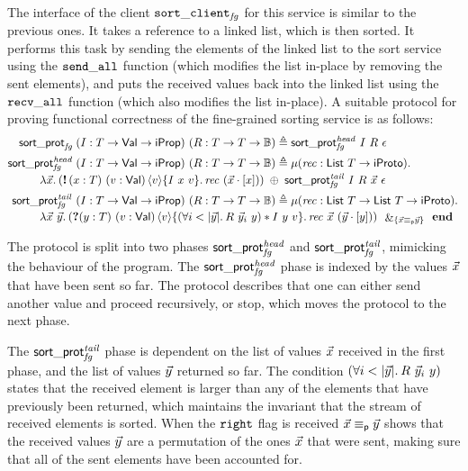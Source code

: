 The interface of the client $\mathtt{sort\_client}_{\mathit{fg}}$ for this service is similar
to the previous ones.
It takes a reference to a linked list, which is then sorted.
It performs this task by sending the elements of the linked list to the sort
service using the $\mathtt{send\_all}$ function (which modifies the list in-place
by removing the sent elements), and puts the received values
back into the linked list using the $\mathtt{recv\_all}$ function (which also modifies
the list in-place).
A suitable protocol for proving functional correctness of the fine-grained
sorting service is as follows:
%
\begin{align*}
\listsortelemprotname\; (\interpvar : \tvar \to \Val \to \Prop)
  \ (\relvar : \tvar \to \tvar \to \bool) \eqdef{}&
  \listsortelemprotheadname\ \interpvar\ \relvar\ \nil \\[0.1em]
\listsortelemprotheadname\; (\interpvar : \tvar \to \Val \to \Prop)
  \ (\relvar : \tvar \to \tvar \to \bool) \eqdef{}&
  \MU (\recvar : \List\ \tvar \to \iProto).\\[-0.2em]
  &\hspace{-22em}
  \Lam \vec\var. \selectprot
    {(\sendprot {(\var : \tvar)\ (\val : \Val)} \val
       {\interpvar\ \var\ \val}
       {\recvar\ (\snoc{\var}{\vec\var})}) \ }
    {\ \listsortelemprottailname\ \interpvar\ \relvar\ \vec{\var}\ \nil} \\[0.1em]
\listsortelemprottailname\ (\interpvar : \tvar \to \Val \to \Prop)
  \ (\relvar : \tvar \to \tvar \to \bool) \eqdef{}&
  \MU (\recvar : \List\ \tvar \to \List\ \tvar \to \iProto). \\[-0.2em]
  &\hspace{-22em}
  \Lam \vec\var\ \vec\varB. \branchprotpropr
  {(\recvprot{(\varB : \tvar)\ (\val : \Val)} \val
     {(\All i < \listlength {\vec\varB}. \relvar\ \vec\varB_i\ \varB) * \interpvar\ \varB\ \val}
     {\recvar\ \vec\var\ (\snoc{\varB}{\vec\varB})}) \ }
  {\vec\var \perm \vec\varB}
  {\ \protend}
\end{align*}
%

\noindent
The protocol is split into two phases $\mathsf{sort\_prot}_{\mathit{fg}}^{\mathit{head}}$ and
$\mathsf{sort\_prot}_{\mathit{fg}}^{\mathit{tail}}$, mimicking the behaviour of the program.
The $\mathsf{sort\_prot}_{\mathit{fg}}^{\mathit{head}}$ phase is indexed by the values $\vec{x}$ that
have been sent so far.
The protocol describes that one can either send another value and proceed
recursively, or stop, which moves the protocol to the next phase.

The $\mathsf{sort\_prot}_{\mathit{fg}}^{\mathit{tail}}$ phase is dependent on the list of values $\vec{x}$
received in the first phase, and the list of values $\vec{y}$ returned so
far.
The condition $(\All i < \listlength {\vec\varB}. \relvar\ \vec\varB_i\ \varB)$
states that the received element is larger than any of the elements that have
previously been returned,
which maintains the invariant that the stream of received elements is sorted.
When the $\mathtt{right}$ flag is received $\vec{x} \equiv_{\mathsf p} \vec{y}$ shows that the
received values $\vec{y}$ are a permutation of the ones $\vec{x}$ that were sent,
making sure that all of the sent elements have been accounted for.

